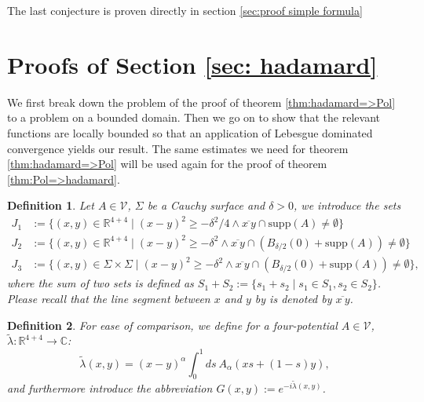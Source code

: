 \documentclass[b5paper,draft,openbib,12pt]{memoir}
\newtheorem{Def}{Definition}
\begin{document}
The last conjecture is proven directly in section \ref{sec:proof simple formula}



\section[Proofs of Section \ref{sec: hadamard}][proofs for Hadamard comparison]{Proofs of Section \ref{sec: hadamard}}\label{sec: proof hadamard}

We first break  down the problem of the proof of theorem \ref{thm:hadamard=>Pol} to a problem on a bounded domain. Then we go on 
to show that the relevant functions are locally bounded so that an application of Lebesgue dominated convergence yields our result.
The same estimates we need for theorem \ref{thm:hadamard=>Pol} will be used again for the proof of theorem \ref{thm:Pol=>hadamard}.

\begin{Def} Let \(A\in \mathcal{V}\), \(\Sigma\) be a Cauchy surface 
  and \(\delta>0\), we introduce the sets
\begin{align}
J_1&:=\!\{(x,y)\!\in\!\mathbb{R}^{4+4}\mid (x-y)^2\ge -\delta^2/4 \wedge \overline{x~y} \cap \mathrm{supp}(A)\neq \emptyset\}\\
J_2&:=\!\{(x,y)\!\in\mathbb{R}^{4+4}\mid\!\! (x-y)^2\ge -\delta^2\!\! \wedge \overline{x~y} \!\cap\!\! \left(B_{\delta/2}(0)\!+\!\mathrm{supp}(A)\right)\!\neq\! \emptyset\}\\
J_3&:=\!\{(x,y)\!\in\! \Sigma \!\times\! \Sigma \mid\!\! (x-y)^2 \ge-\delta^2\!\!\wedge\! \overline{x ~ y} \!\cap\!\! \left(B_{\delta/2}(0)\!\!+\!\mathrm{supp}(A) \right)\!\neq\! \emptyset \},
\end{align}
where the sum of two sets is defined as 
\(S_1+S_2:=\{s_1+s_2\mid s_1\in S_1, s_2\in S_2\}\). 
Please recall that the line segment between \(x\) and \(y\) 
by is denoted by \(\overline{x~y}\). 
\end{Def}

\begin{Def}
For ease of comparison, we define 
for a four-potential \(A\in \mathcal{V}\),
\(\tilde{\lambda}:\mathbb{R}^{4+4}\rightarrow \mathbb{C}\):
\begin{equation}
\tilde{\lambda}(x,y)= (x-y)^\alpha\int_0^1 ds ~A_\alpha (x s + (1-s)y),
\end{equation}
and furthermore introduce the abbreviation \(G(x,y):=e^{-i \tilde{\lambda}(x,y)} \).
\end{Def}
\end{document}
